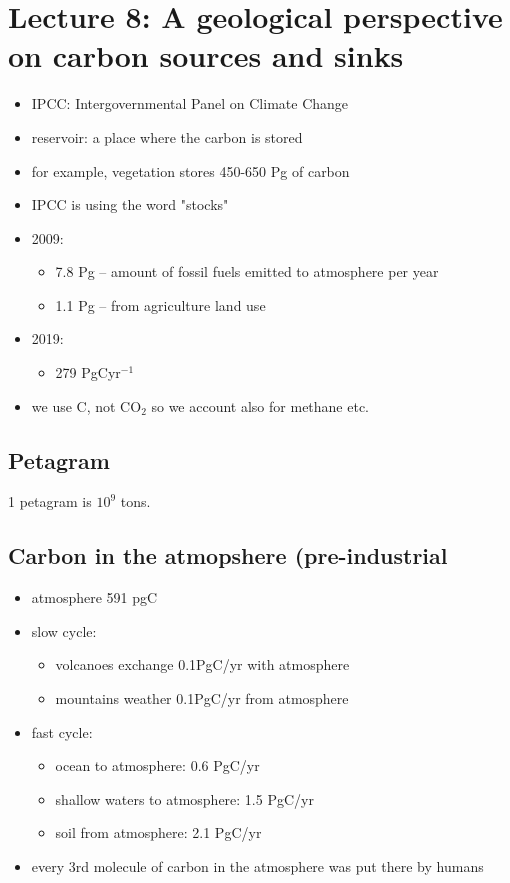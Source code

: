 \section{Lecture 8: A geological perspective on carbon sources and sinks}

\begin{itemize}
	\item IPCC: Intergovernmental Panel on Climate Change
	\item reservoir: a place where the carbon is stored
	\item for example, vegetation stores 450-650 Pg of carbon
	\item IPCC is using the word "stocks"
	\item 2009:
	\begin{itemize}
		\item 7.8 Pg -- amount of fossil fuels emitted to atmosphere
		per year
		\item 1.1 Pg -- from agriculture land use
	\end{itemize}
	\item 2019:
	\begin{itemize}
		\item 279 PgCyr$^{-1}$
	\end{itemize}
	\item we use C, not CO$_2$ so we account also for methane etc.
\end{itemize}

\subsection{Petagram}

1 petagram is $10^9$ tons.

\subsection{Carbon in the atmopshere (pre-industrial}

\begin{itemize}
	\item atmosphere 591 pgC
	\item slow cycle:
	\begin{itemize}
		\item volcanoes exchange 0.1PgC/yr with atmosphere
		\item mountains weather 0.1PgC/yr from atmosphere
	\end{itemize}
	\item fast cycle:
	\begin{itemize}
		\item ocean to atmosphere: 0.6 PgC/yr
		\item shallow waters to atmosphere: 1.5 PgC/yr
		\item soil from atmosphere: 2.1 PgC/yr
	\end{itemize}
	\item every 3rd molecule of carbon in the atmosphere was put there by
	humans
\end{itemize}

